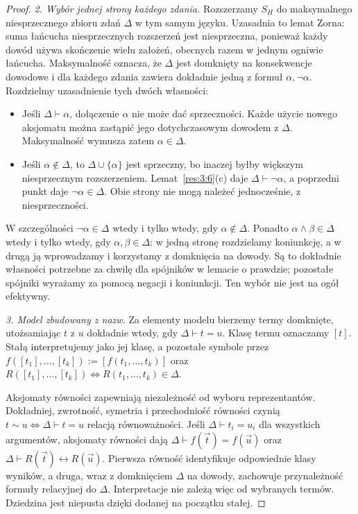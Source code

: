 \documentclass[11pt,a4paper]{article}
\numberwithin{equation}{section}
\theoremstyle{plain}
\theoremstyle{definition}
\theoremstyle{remark}
\begin{document}
\begin{proof}
\emph{2. Wybór jednej strony każdego zdania.} Rozszerzamy $S_H$ do maksymalnego niesprzecznego zbioru zdań $\Delta$ w tym samym języku. Uzasadnia to lemat Zorna: suma łańcucha niesprzecznych rozszerzeń jest niesprzeczna, ponieważ każdy dowód używa skończenie wielu założeń, obecnych razem w jednym ogniwie łańcucha. Maksymalność oznacza, że $\Delta$ jest domknięty na konsekwencje dowodowe i dla każdego zdania zawiera dokładnie jedną z formuł $\alpha,\neg\alpha$. Rozdzielmy uzasadnienie tych dwóch własności:
\begin{itemize}
\item Jeśli $\Delta\vdash\alpha$, dołączenie $\alpha$ nie może dać sprzeczności. Każde użycie nowego aksjomatu można zastąpić jego dotychczasowym dowodem z $\Delta$. Maksymalność wymusza zatem $\alpha\in\Delta$.
\item Jeśli $\alpha\notin\Delta$, to $\Delta\cup\{\alpha\}$ jest sprzeczny, bo inaczej byłby większym niesprzecznym rozszerzeniem. Lemat~\ref{res:3:6}(c) daje $\Delta\vdash\neg\alpha$, a poprzedni punkt daje $\neg\alpha\in\Delta$. Obie strony nie mogą należeć jednocześnie, z niesprzeczności.
\end{itemize}
W szczególności $\neg\alpha\in\Delta$ wtedy i tylko wtedy, gdy $\alpha\notin\Delta$. Ponadto $\alpha\land\beta\in\Delta$ wtedy i tylko wtedy, gdy $\alpha,\beta\in\Delta$: w jedną stronę rozdzielamy koniunkcję, a w drugą ją wprowadzamy i korzystamy z domknięcia na dowody. Są to dokładnie własności potrzebne za chwilę dla spójników w lemacie o prawdzie; pozostałe spójniki wyrażamy za pomocą negacji i koniunkcji. Ten wybór nie jest na ogół efektywny.

\emph{3. Model zbudowany z nazw.} Za elementy modelu bierzemy termy domknięte, utożsamiając $t$ z $u$ dokładnie wtedy, gdy $\Delta\vdash t=u$. Klasę termu oznaczamy $[t]$. Stałą interpretujemy jako jej klasę, a pozostałe symbole przez $f([t_1],\ldots,[t_k]):=[f(t_1,\ldots,t_k)]$ oraz $R([t_1],\ldots,[t_k])\Longleftrightarrow R(t_1,\ldots,t_k)\in\Delta$.

Aksjomaty równości zapewniają niezależność od wyboru reprezentantów. Dokładniej, zwrotność, symetria i przechodniość równości czynią $t\sim u\Longleftrightarrow\Delta\vdash t=u$ relacją równoważności. Jeśli $\Delta\vdash t_i=u_i$ dla wszystkich argumentów, aksjomaty równości dają $\Delta\vdash f(\vec t)=f(\vec u)$ oraz $\Delta\vdash R(\vec t)\leftrightarrow R(\vec u)$. Pierwsza równość identyfikuje odpowiednie klasy wyników, a druga, wraz z domknięciem $\Delta$ na dowody, zachowuje przynależność formuły relacyjnej do $\Delta$. Interpretacje nie zależą więc od wybranych termów. Dziedzina jest niepusta dzięki dodanej na początku stałej.


\end{proof}
\end{document}

